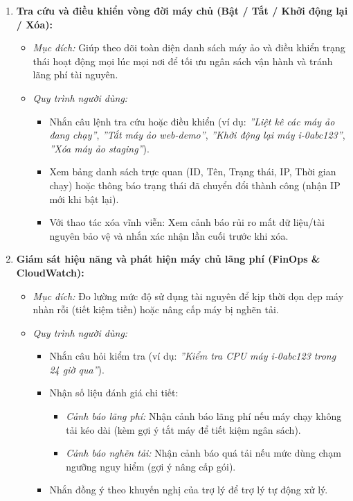 \documentclass[a4paper,12pt]{article}
\begin{document}
\begin{enumerate}
  \item \textbf{Tra cứu và điều khiển vòng đời máy chủ (Bật / Tắt / Khởi động lại / Xóa):}
  \begin{itemize}
    \item \textit{Mục đích:} Giúp theo dõi toàn diện danh sách máy ảo và điều khiển trạng thái hoạt động mọi lúc mọi nơi để tối ưu ngân sách vận hành và tránh lãng phí tài nguyên.
    \item \textit{Quy trình người dùng:}
    \begin{itemize}
      \item Nhắn câu lệnh tra cứu hoặc điều khiển (ví dụ: \textit{''Liệt kê các máy ảo đang chạy''}, \textit{''Tắt máy ảo web-demo''}, \textit{''Khởi động lại máy i-0abc123''}, \textit{''Xóa máy ảo staging''}).
      \item Xem bảng danh sách trực quan (ID, Tên, Trạng thái, IP, Thời gian chạy) hoặc thông báo trạng thái đã chuyển đổi thành công (nhận IP mới khi bật lại).
      \item Với thao tác xóa vĩnh viễn: Xem cảnh báo rủi ro mất dữ liệu/tài nguyên bảo vệ và nhắn xác nhận lần cuối trước khi xóa.
    \end{itemize}
  \end{itemize}

  \item \textbf{Giám sát hiệu năng và phát hiện máy chủ lãng phí (FinOps \& CloudWatch):}
  \begin{itemize}
    \item \textit{Mục đích:} Đo lường mức độ sử dụng tài nguyên để kịp thời dọn dẹp máy nhàn rỗi (tiết kiệm tiền) hoặc nâng cấp máy bị nghẽn tải. 
    \item \textit{Quy trình người dùng:}
    \begin{itemize}
      \item Nhắn câu hỏi kiểm tra (ví dụ: \textit{''Kiểm tra CPU máy i-0abc123 trong 24 giờ qua''}).
      \item Nhận số liệu đánh giá chi tiết:
      \begin{itemize}
        \item \textit{Cảnh báo lãng phí:} Nhận cảnh báo lãng phí nếu máy chạy không tải kéo dài (kèm gợi ý tắt máy để tiết kiệm ngân sách).
        \item \textit{Cảnh báo nghẽn tải:} Nhận cảnh báo quá tải nếu mức dùng chạm ngưỡng nguy hiểm (gợi ý nâng cấp gói).
      \end{itemize}
      \item Nhắn đồng ý theo khuyến nghị của trợ lý để trợ lý tự động xử lý.
    \end{itemize}
  \end{itemize}


\end{enumerate}
\end{document}
